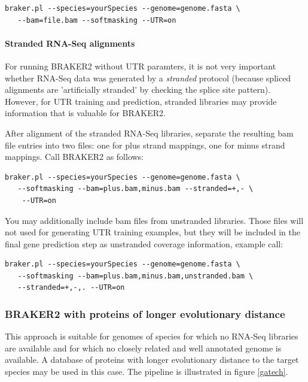 \documentclass[]{article}
\let\oldparagraph\paragraph
\renewcommand{\paragraph}[1]{\oldparagraph{#1}\mbox{}}
\begin{document}
\begin{verbatim}
braker.pl --species=yourSpecies --genome=genome.fasta \
   --bam=file.bam --softmasking --UTR=on
\end{verbatim}

\paragraph{Stranded RNA-Seq
alignments}\label{stranded-rna-seq-alignments}

For running BRAKER2 without UTR paramters, it is not very important
whether RNA-Seq data was generated by a \emph{stranded} protocol
(because spliced alignments are 'artificially stranded' by checking the
splice site pattern). However, for UTR training and prediction, stranded
libraries may provide information that is valuable for BRAKER2.

After alignment of the stranded RNA-Seq libraries, separate the
resulting bam file entries into two files: one for plus strand mappings,
one for minus strand mappings. Call BRAKER2 as follows:

\begin{verbatim}
braker.pl --species=yourSpecies --genome=genome.fasta \
   --softmasking --bam=plus.bam,minus.bam --stranded=+,- \
    --UTR=on
\end{verbatim}

You may additionally include bam files from unstranded libraries. Those
files will not used for generating UTR training examples, but they will
be included in the final gene prediction step as unstranded coverage
information, example call:

\begin{verbatim}
braker.pl --species=yourSpecies --genome=genome.fasta \
   --softmasking --bam=plus.bam,minus.bam,unstranded.bam \
   --stranded=+,-,. --UTR=on
\end{verbatim}

\subsubsection{BRAKER2 with proteins of longer evolutionary distance}\label{braker2-with-proteins-of-longer-evolutionary-distance}

This approach is suitable for genomes of species for which no RNA-Seq
libraries are available and for which no closely related and well
annotated genome is available. A database of proteins with longer
evolutionary distance to the target species may be used in this case.
The pipeline is illustrated in figure \ref{gatech}.
\end{document}
